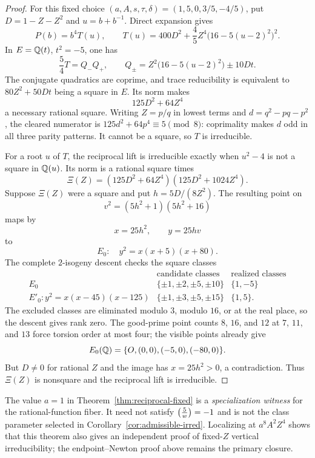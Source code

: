 \begin{proof}
For this fixed choice
$(a,A,s,\tau,\delta)=(1,5,0,3/5,-4/5)$, put
$D=1-Z-Z^2$ and $u=b+b^{-1}$.  Direct expansion gives
\[
 P(b)=b^4T(u),\qquad
 T(u)=400D^2+\frac45Z^4\bigl(16-5(u-2)^2\bigr)^2.
\]
In $E=\mathbb{Q}(t)$, $t^2=-5$, one has
\[
 \frac54T=Q_-Q_+,\qquad
 Q_\pm=Z^2\bigl(16-5(u-2)^2\bigr)\pm10Dt.
\]
The conjugate quadratics are coprime, and trace reducibility is equivalent
to $80Z^2+50Dt$ being a square in $E$.  Its norm makes
\[
 125D^2+64Z^4
\]
a necessary rational square.  Writing $Z=p/q$ in lowest terms and
$d=q^2-pq-p^2$, the cleared numerator is
$125d^2+64p^4\equiv5\pmod8$: coprimality makes $d$ odd in all three
parity patterns.  It cannot be a square, so $T$ is irreducible.

For a root $u$ of $T$, the reciprocal lift is irreducible exactly when
$u^2-4$ is not a square in $\mathbb{Q}(u)$.  Its norm is a rational square times
\[
 \Xi(Z)=(125D^2+64Z^4)(125D^2+1024Z^4).
\]
Suppose $\Xi(Z)$ were a square and put $h=5D/(8Z^2)$.  The resulting point
on
\[
 v^2=(5h^2+1)(5h^2+16)
\]
maps by
\[
 x=25h^2,\qquad y=25hv
\]
to
\[
 E_0:\quad y^2=x(x+5)(x+80).
\]
The complete $2$-isogeny descent checks the square classes
\[
\begin{array}{c|c|c}
&\text{candidate classes}&\text{realized classes}\\ \hline
E_0&\{\pm1,\pm2,\pm5,\pm10\}&\{1,-5\}\\
E'_0:y^2=x(x-45)(x-125)&\{\pm1,\pm3,\pm5,\pm15\}&\{1,5\}.
\end{array}
\]
The excluded classes are eliminated modulo $3$, modulo $16$, or at the
real place, so the descent gives rank zero.  The good-prime point counts
$8$, $16$, and $12$ at $7$, $11$, and $13$ force torsion order at most
four; the visible points already give
\[
 E_0(\mathbb{Q})=\{O,(0,0),(-5,0),(-80,0)\}.
\]
But $D\ne0$ for rational $Z$ and the image has $x=25h^2>0$, a
contradiction.  Thus $\Xi(Z)$ is nonsquare and the reciprocal lift is
irreducible.
\end{proof}

The value $a=1$ in Theorem~\ref{thm:reciprocal-fixed} is a
\emph{specialization witness} for the rational-function fiber.  It need
not satisfy $\left(\frac{5}{w}\right)=-1$ and is not the class parameter selected in
Corollary~\ref{cor:admissible-irred}.  Localizing at
$a^8A^2Z^4$ shows that this theorem also gives an independent proof of
fixed-$Z$ vertical irreducibility; the endpoint--Newton proof above remains
the primary closure.

